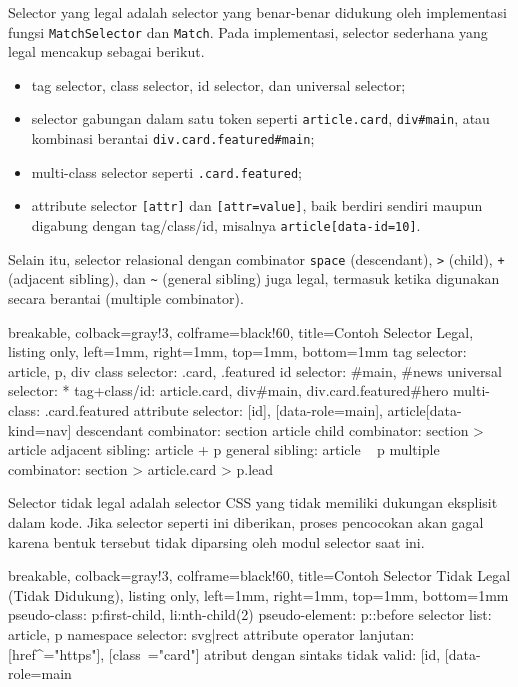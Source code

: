 Selector yang legal adalah selector yang benar-benar didukung oleh implementasi fungsi \texttt{MatchSelector} dan \texttt{Match}. Pada implementasi, selector sederhana yang legal mencakup sebagai berikut.

\begin{itemize}
    \item tag selector, class selector, id selector, dan universal selector;
    \item selector gabungan dalam satu token seperti \texttt{article.card}, \texttt{div\#main}, atau kombinasi berantai \texttt{div.card.featured\#main};
    \item multi-class selector seperti \texttt{.card.featured};
    \item attribute selector \texttt{[attr]} dan \texttt{[attr=value]}, baik berdiri sendiri maupun digabung dengan tag/class/id, misalnya \texttt{article[data-id=10]}.
\end{itemize}

Selain itu, selector relasional dengan combinator \texttt{space} (descendant), \texttt{>} (child), \texttt{+} (adjacent sibling), dan \texttt{\textasciitilde{}} (general sibling) juga legal, termasuk ketika digunakan secara berantai (multiple combinator).

\begin{tcblisting}{
        breakable,
        colback=gray!3,
        colframe=black!60,
        title=Contoh Selector Legal,
        listing only,
        left=1mm,
        right=1mm,
        top=1mm,
        bottom=1mm
    }
    tag selector: article, p, div
    class selector: .card, .featured
    id selector: #main, #news
    universal selector: *
    tag+class/id: article.card, div#main, div.card.featured#hero
    multi-class: .card.featured
    attribute selector: [id], [data-role=main], article[data-kind=nav]
    descendant combinator: section article
    child combinator: section > article
    adjacent sibling: article + p
    general sibling: article ~ p
    multiple combinator: section > article.card > p.lead
\end{tcblisting}

Selector tidak legal adalah selector CSS yang tidak memiliki dukungan eksplisit dalam kode. Jika selector seperti ini diberikan, proses pencocokan akan gagal karena bentuk tersebut tidak diparsing oleh modul selector saat ini.

\begin{tcblisting}{
        breakable,
        colback=gray!3,
        colframe=black!60,
        title=Contoh Selector Tidak Legal (Tidak Didukung),
        listing only,
        left=1mm,
        right=1mm,
        top=1mm,
        bottom=1mm
    }
    pseudo-class: p:first-child, li:nth-child(2)
    pseudo-element: p::before
    selector list: article, p
    namespace selector: svg|rect
    attribute operator lanjutan: [href^="https"], [class~="card"]
    atribut dengan sintaks tidak valid: [id, [data-role=main
\end{tcblisting}

